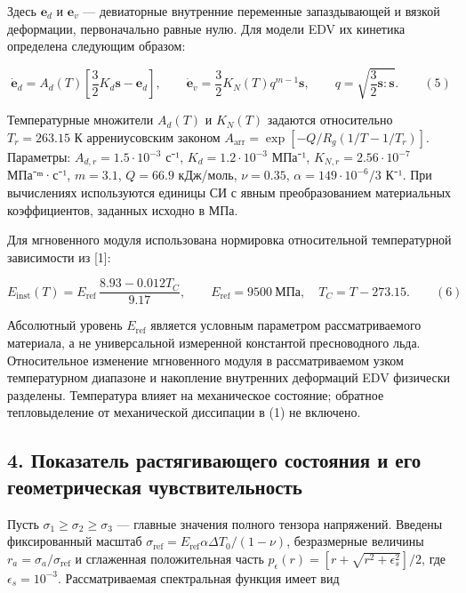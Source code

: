 \documentclass[
]{article}
\begin{document}
Здесь \(\boldsymbol e_d\) и \(\boldsymbol e_v\) --- девиаторные
внутренние переменные запаздывающей и вязкой деформации, первоначально
равные нулю. Для модели EDV их кинетика определена следующим образом:

\[
\dot{\boldsymbol e}_d=A_d(T)\left[\frac32K_d\boldsymbol s-\boldsymbol e_d\right],\qquad
\dot{\boldsymbol e}_v=\frac32K_N(T)q^{m-1}\boldsymbol s,\qquad
q=\sqrt{\frac32\boldsymbol s:\boldsymbol s}. \qquad(5)
\]

Температурные множители \(A_d(T)\) и \(K_N(T)\) задаются относительно
\(T_r=263.15\) К аррениусовским законом
\(A_{\mathrm{arr}}=\exp[-Q/R_g(1/T-1/T_r)]\). Параметры:
\(A_{d,r}=1.5\cdot10^{-3}\) с⁻¹, \(K_d=1.2\cdot10^{-3}\) МПа⁻¹,
\(K_{N,r}=2.56\cdot10^{-7}\) МПа⁻ᵐ·с⁻¹, \(m=3.1\), \(Q=66.9\) кДж/моль,
\(\nu=0.35\), \(\alpha=149\cdot10^{-6}/3\) К⁻¹. При вычислениях
используются единицы СИ с явным преобразованием материальных
коэффициентов, заданных исходно в МПа.

Для мгновенного модуля использована нормировка относительной
температурной зависимости из {[}1{]}:

\[
E_{\mathrm{inst}}(T)=E_{\mathrm{ref}}\,\frac{8.93-0.012T_C}{9.17},\qquad
E_{\mathrm{ref}}=9500\ \text{МПа},\quad T_C=T-273.15. \qquad(6)
\]

Абсолютный уровень \(E_{\mathrm{ref}}\) является условным параметром
рассматриваемого материала, а не универсальной измеренной константой
пресноводного льда. Относительное изменение мгновенного модуля в
рассматриваемом узком температурном диапазоне и накопление внутренних
деформаций EDV физически разделены. Температура влияет на механическое
состояние; обратное тепловыделение от механической диссипации в (1) не
включено.

\subsection{4. Показатель растягивающего состояния и его геометрическая
чувствительность}\label{ux43fux43eux43aux430ux437ux430ux442ux435ux43bux44c-ux440ux430ux441ux442ux44fux433ux438ux432ux430ux44eux449ux435ux433ux43e-ux441ux43eux441ux442ux43eux44fux43dux438ux44f-ux438-ux435ux433ux43e-ux433ux435ux43eux43cux435ux442ux440ux438ux447ux435ux441ux43aux430ux44f-ux447ux443ux432ux441ux442ux432ux438ux442ux435ux43bux44cux43dux43eux441ux442ux44c}

Пусть \(\sigma_1\ge\sigma_2\ge\sigma_3\) --- главные значения полного
тензора напряжений. Введены фиксированный масштаб
\(\sigma_{\mathrm{ref}}=E_{\mathrm{ref}}\alpha\Delta T_0/(1-\nu)\),
безразмерные величины \(r_a=\sigma_a/\sigma_{\mathrm{ref}}\) и
сглаженная положительная часть
\(p_\epsilon(r)=[r+\sqrt{r^2+\epsilon_s^2}]/2\), где
\(\epsilon_s=10^{-3}\). Рассматриваемая спектральная функция имеет вид
\end{document}
